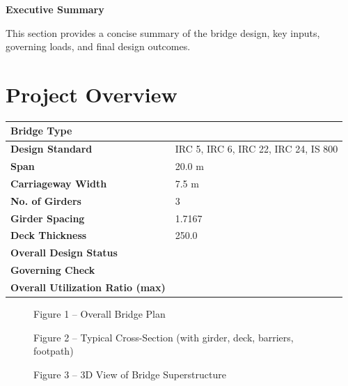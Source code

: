 
\newpage
{\centering\Large\bfseries Executive Summary\par}
\vspace{0.8em}

This section provides a concise summary of the bridge design, key inputs, governing loads, and final design outcomes.

\section*{Project Overview}
\label{sec:project-overview}


\begin{tabular}{|L{5.5cm}|L{8.5cm}|}
\hline
\textbf{Bridge Type} &  \\
\hline
\textbf{Design Standard} & IRC 5, IRC 6, IRC 22, IRC 24, IS 800 \\
\hline
\textbf{Span} & 20.0 m \\
\hline
\textbf{Carriageway Width} & 7.5 m \\
\hline
\textbf{No. of Girders} & 3 \\
\hline
\textbf{Girder Spacing} & 1.7167 \\
\hline
\textbf{Deck Thickness} & 250.0 \\
\hline
\textbf{Overall Design Status} &  \\
\hline
\textbf{Governing Check} &  \\
\hline
\textbf{Overall Utilization Ratio (max)} &  \\
\hline
\end{tabular}


\begin{figure}[H]
\centering
{}
\caption*{Figure 1 -- Overall Bridge Plan}
\end{figure}

\newpage

\begin{figure}[H]
\centering
{}
\caption*{Figure 2 -- Typical Cross-Section (with girder, deck, barriers, footpath)}
\end{figure}

\begin{figure}[H]
\centering
{}
\caption*{Figure 3 -- 3D View of Bridge Superstructure}
\end{figure}

